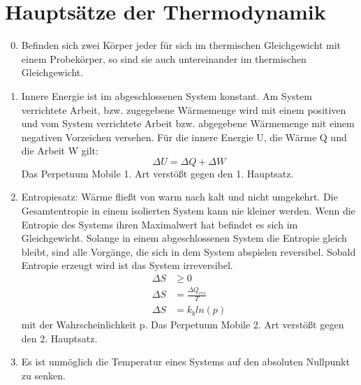 \documentclass[10pt,a4paper]{article}
\begin{document}
\section{Hauptsätze der Thermodynamik}
\begin{enumerate}
\setcounter{enumi}{-1}
\item Befinden sich zwei Körper jeder für sich im thermischen Gleichgewicht mit einem Probekörper, so sind sie auch untereinander im thermischen Gleichgewicht.
\item Innere Energie ist im abgeschlossenen System konstant. Am System verrichtete Arbeit, bzw. zugegebene Wärmemenge wird mit einem positiven und vom System verrichtete Arbeit bzw. abgegebene Wärmemenge mit einem negativen Vorzeichen versehen. Für die innere Energie U, die Wärme Q und die Arbeit W gilt:
\begin{equation}
\Delta U = \Delta Q + \Delta W
\end{equation}
Das Perpetuum Mobile 1. Art verstößt gegen den 1. Hauptsatz.
\item Entropiesatz: Wärme fließt von warm nach kalt und nicht umgekehrt. Die Gesamtentropie in einem isolierten System kann nie kleiner werden. Wenn die Entropie des Systems ihren Maximalwert hat befindet es sich im Gleichgewicht. \newline
Solange in einem abgeschlossenen System die Entropie gleich bleibt, sind alle Vorgänge, die sich in dem System abspielen reversibel. Sobald Entropie erzeugt wird ist das System irreversibel.
\begin{align}
\Delta S &\ge 0 \\
\Delta S &= \frac{\Delta Q_{rev}}{T} \\
\Delta S &= k_b ln(p) 
\end{align}
mit der Wahrscheinlichkeit p. \newline
Das Perpetuum Mobile 2. Art verstößt gegen den 2. Hauptsatz.
\item Es ist unmöglich die Temperatur eines Systems auf den absoluten Nullpunkt zu senken.
\end{enumerate}
\end{document}
